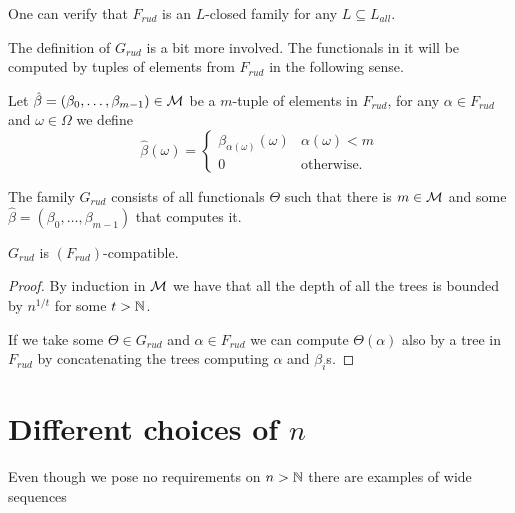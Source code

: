 One can verify that $F_{rud}$ is an $L$-closed family for any $L\subseteq L_{all}$.

The definition of $G_{rud}$ is a bit more involved. The functionals in it will be computed by tuples of elements from $F_{rud}$ in the following sense.

\begin{defi}
Let $\hat\beta=(\beta_0,\dots,\beta_{m-1})\in\mathcal{M}$ be a $m$-tuple of elements in $F_{rud}$, for any $\alpha\in F_{rud}$ and $\omega\in\Omega$ we define
\[\hat\beta(\omega)=
\begin{cases}
\beta_{\alpha(\omega)}(\omega)&\alpha(\omega)<m\\
0&\text{otherwise.}
\end{cases}\]
\end{defi}

\begin{defi}
The family $G_{rud}$ consists of all functionals $\Theta$ such that there is $m\in\mathcal{M}$ and some $\hat \beta=(\beta_0,\dots,\beta_{m-1})$ that computes it.
\end{defi}

\begin{lemm}
$G_{rud}$ is $(F_{rud})$-compatible.
\end{lemm}
\begin{proof}
By induction in $\mathcal{M}$ we have that all the depth of all the trees is bounded by $n^{1/t}$ for some $t>\mathbb{N}$.

If we take some $\Theta\in G_{rud}$ and $\alpha\in F_{rud}$ we can compute $\Theta(\alpha)$ also by a tree in $F_{rud}$ by concatenating the trees computing $\alpha$ and $\beta_i$s.
\end{proof}

\section{Different choices of $n$}

Even though we pose no requirements on $n>\mathbb{N}$ there are examples of wide sequences 

